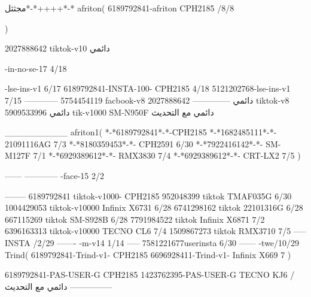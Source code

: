 مجثثل*-*++++*-*
afriton(
6189792841-afriton CPH2185  /8/8

)

2027888642 tiktok-v10
دائمي

-in-no-se-17 4/18

-lse-ins-v1 6/17
6189792841-INSTA-100- CPH2185 4/18
5121202768-lse-ins-v1 7/15
------------
5754454119 facbook-v8
دائمي
--------------
2027888642 tiktok-v8
دائمي
5909533996 tik-v1000  SM-N950F
دائمي مع التحديث

__________
afriton1(
*-*6189792841*-*-CPH2185
*-*1682485111*-*- 21091116AG  7/3
*-*8180359453*-*-  CPH2591  6/30
*-*7922416142*-*-  SM-M127F  7/1
*-*6929389612*-*-  RMX3830  7/4
*-*6929389612*-*-  CRT-LX2  7/5
)


------
------------
-face-15 2/2

--------
6189792841 tiktok-v1000- CPH2185 
952048399 tiktok TMAF035G  6/30
1004429053 tiktok-v10000 Infinix X6731  6/28
6741298162 tiktok 22101316G  6/28
667115269 tiktok SM-S928B  6/28
7791984522 tiktok Infinix X6871  7/2
6396163313 tiktok-v10000 TECNO CL6  7/4
1509867273 tiktok RMX3710  7/5
-----
 INSTA /2/29
-------
-m-v14 1/14
-----
7581221677userinsta 6/30
------
-twe/10/29
Trind(
6189792841-Trind-v1- CPH2185 
6696928411-Trind-v1- Infinix X669 7\2
)


6189792841-PAS-USER-G CPH2185 
1423762395-PAS-USER-G TECNO KJ6  /دائمي مع التحديث
    ---------------
